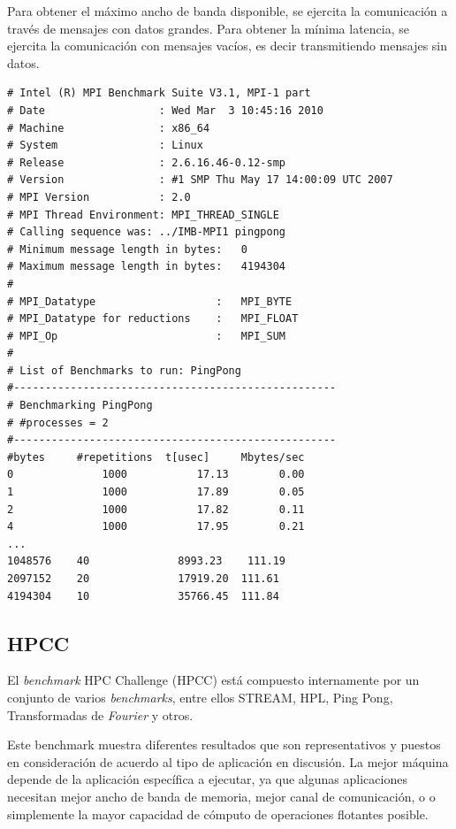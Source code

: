 \documentclass[a4paper]{report}
\begin{document}
\bigskip

Para obtener el m\'aximo ancho de banda disponible, se ejercita la comunicaci\'on a trav\'es de mensajes con datos grandes.
Para obtener la m\'inima latencia, se ejercita la comunicaci\'on con mensajes vac\'ios, es decir transmitiendo mensajes sin datos.

{\small
\begin{verbatim}
# Intel (R) MPI Benchmark Suite V3.1, MPI-1 part
# Date                  : Wed Mar  3 10:45:16 2010
# Machine               : x86_64
# System                : Linux
# Release               : 2.6.16.46-0.12-smp
# Version               : #1 SMP Thu May 17 14:00:09 UTC 2007
# MPI Version           : 2.0
# MPI Thread Environment: MPI_THREAD_SINGLE
# Calling sequence was: ../IMB-MPI1 pingpong
# Minimum message length in bytes:   0
# Maximum message length in bytes:   4194304
#
# MPI_Datatype                   :   MPI_BYTE
# MPI_Datatype for reductions    :   MPI_FLOAT
# MPI_Op                         :   MPI_SUM
#
# List of Benchmarks to run: PingPong
#---------------------------------------------------
# Benchmarking PingPong
# #processes = 2
#---------------------------------------------------
#bytes     #repetitions  t[usec]     Mbytes/sec
0              1000           17.13        0.00
1              1000           17.89        0.05
2              1000           17.82        0.11
4              1000           17.95        0.21
...
1048576    40              8993.23    111.19
2097152    20              17919.20  111.61
4194304    10              35766.45  111.84
\end{verbatim}
}

\subsection{HPCC}

El {\it benchmark} HPC Challenge \cite{hpcc} (HPCC) est\'a compuesto internamente por un conjunto de
varios {\it benchmarks}, entre ellos STREAM, HPL, Ping Pong, Transformadas de {\it Fourier}
y otros.

\bigskip

Este benchmark muestra diferentes resultados que son representativos
y puestos en consideraci\'on de acuerdo al tipo de aplicaci\'on en discusi\'on.
La mejor m\'aquina depende de la aplicaci\'on espec\'ifica a ejecutar, ya que algunas
aplicaciones necesitan mejor ancho de banda de memoria, mejor canal de comunicaci\'on, o
o simplemente la mayor capacidad de c\'omputo de operaciones flotantes posible.
\end{document}
